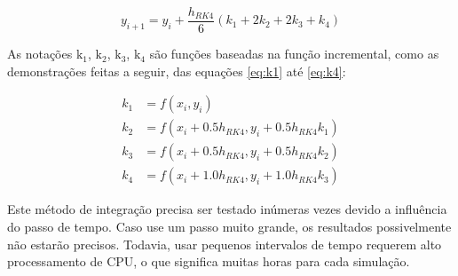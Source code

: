 \begin{equation}
    \label{eq:rk4-completo}
    y_{i+1} = y_{i} + \frac{h_{RK4}}{6}(k_{1}+2k_{2}+2k_{3}+k_{4})
\end{equation}

As notações \(\text{k}_{1}\), \(\text{k}_{2}\), \(\text{k}_{3}\), \(\text{k}_{4}\) são funções baseadas na função incremental, como as demonstrações feitas a seguir, das equações \ref{eq:k1} até \ref{eq:k4}:

\begin{subequations}\label{eq:rk4-termos-k1-ate-k4}
\begin{align}
    \label{eq:k1}
    k_{1} &= f(x_{i},y_{i}) \\
    \label{eq:k2}
    k_{2} &= f(x_{i}+\num{0,5}h_{RK4},y_{i}+\num{0,5}h_{RK4}k_{1}) \\
    \label{eq:k3}
    k_{3} &= f(x_{i}+\num{0,5}h_{RK4},y_{i}+\num{0,5}h_{RK4}k_{2}) \\
    \label{eq:k4}
    k_{4} &= f(x_{i}+\num{1,0}h_{RK4},y_{i}+\num{1,0}h_{RK4}k_{3}) 
\end{align}
\end{subequations}

Este método de integração precisa ser testado inúmeras vezes devido a influência do passo de tempo. Caso use um passo muito grande, os resultados possivelmente não estarão precisos. Todavia, usar pequenos intervalos de tempo requerem alto processamento de CPU, o que significa muitas horas para cada simulação.
